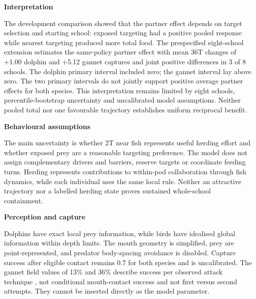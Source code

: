 \documentclass[10pt,a4paper]{article}
\begin{document}
\begin{minipage}[t]{238.10999999999999pt}\vspace{0pt}
\textbf{Interpretation}\par The development comparison showed that the partner effect depends on target selection and starting school: exposed targeting had a positive pooled response while nearest targeting produced more total food. The prespecified eight-school extension estimates the same-policy partner effect with mean 36T changes of +1.00 dolphin and +5.12 gannet captures and joint positive differences in 3 of 8 schools. The dolphin primary interval included zero; the gannet interval lay above zero. The two primary intervals do not jointly support positive average partner effects for both species. This interpretation remains limited by eight schools, percentile-bootstrap uncertainty and uncalibrated model assumptions. Neither pooled total nor one favourable trajectory establishes uniform reciprocal benefit.\par\smallskip
\textbf{Behavioural assumptions}\par The main uncertainty is whether 2T near fish represents useful herding effort and whether exposed prey are a reasonable targeting preference. The model does not assign complementary drivers and barriers, reserve targets or coordinate feeding turns. Herding represents contributions to within-pod collaboration through fish dynamics, while each individual uses the same local rule. Neither an attractive trajectory nor a labelled herding state proves sustained whole-school containment.\par\smallskip
\textbf{Perception and capture}\par Dolphins have exact local prey information, while birds have idealised global information within depth limits. The mouth geometry is simplified, prey are point-represented, and predator body-spacing avoidance is disabled. Capture success after eligible contact remains 0.7 for both species and is uncalibrated. The gannet field values of 13\% and 36\% describe success per observed attack technique \citep{thiebault2016}, not conditional mouth-contact success and not first versus second attempts. They cannot be inserted directly as the model parameter.\par\smallskip
\end{minipage}
\hfill
\end{document}
